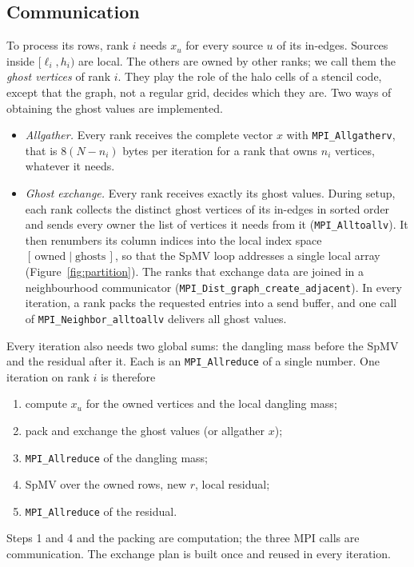 \documentclass[11pt,a4paper]{article}
\newcommand{\code}[1]{\texttt{#1}}
\begin{document}
\subsection{Communication}

To process its rows, rank $i$ needs $x_u$ for every source $u$ of its in-edges. Sources inside $[\ell_i,h_i)$ are
local. The others are owned by other ranks; we call them the \emph{ghost vertices} of rank $i$. They play the role
of the halo cells of a stencil code, except that the graph, not a regular grid, decides which they are. Two ways of
obtaining the ghost values are implemented.
\begin{itemize}
\item \emph{Allgather.} Every rank receives the complete vector $x$ with \code{MPI\_Allgatherv}, that is
  $8(N-n_i)$ bytes per iteration for a rank that owns $n_i$ vertices, whatever it needs.
\item \emph{Ghost exchange.} Every rank receives exactly its ghost values. During setup, each rank collects the
  distinct ghost vertices of its in-edges in sorted order and sends every owner the list of vertices it needs from
  it (\code{MPI\_Alltoallv}). It then renumbers its column indices into the local index space
  $[\,\text{owned} \mid \text{ghosts}\,]$, so that the SpMV loop addresses a single local array
  (Figure~\ref{fig:partition}). The ranks that exchange data are joined in a neighbourhood communicator
  (\code{MPI\_Dist\_graph\_create\_adjacent}). In every iteration, a rank packs the requested entries into a send
  buffer, and one call of \code{MPI\_Neighbor\_alltoallv} delivers all ghost values.
\end{itemize}
Every iteration also needs two global sums: the dangling mass before the SpMV and the residual after it. Each is an
\code{MPI\_Allreduce} of a single number. One iteration on rank $i$ is therefore
\begin{enumerate}
\item compute $x_u$ for the owned vertices and the local dangling mass;
\item pack and exchange the ghost values (or allgather $x$);
\item \code{MPI\_Allreduce} of the dangling mass;
\item SpMV over the owned rows, new $r$, local residual;
\item \code{MPI\_Allreduce} of the residual.
\end{enumerate}
Steps 1 and 4 and the packing are computation; the three MPI calls are communication. The exchange plan is built
once and reused in every iteration.
\end{document}
